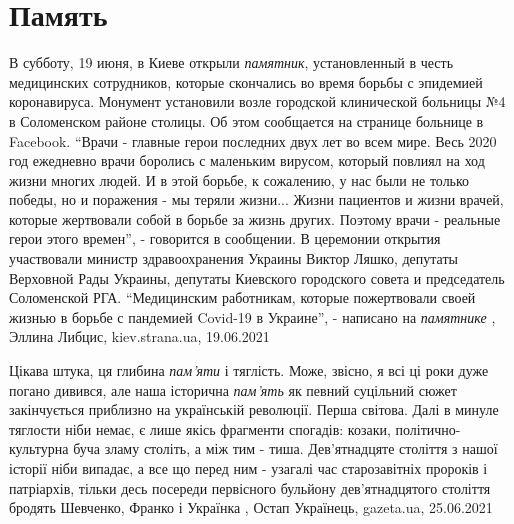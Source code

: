  
 
 
 
 
\chapter{Память}
\label{sec:slova.pamjat}

В субботу, 19 июня, в Киеве открыли \emph{памятник}, установленный в честь
медицинских сотрудников, которые скончались во время борьбы с эпидемией
коронавируса.  Монумент установили возле городской клинической больницы №4 в
Соломенском районе столицы.  Об этом сообщается на странице больнице в
Facebook.  \enquote{Врачи - главные герои последних двух лет во всем мире. Весь
2020 год ежедневно врачи боролись с маленьким вирусом, который повлиял на ход
жизни многих людей. И в этой борьбе, к сожалению, у нас были не только победы,
но и поражения - мы теряли жизни... Жизни пациентов и жизни врачей, которые
жертвовали собой в борьбе за жизнь других. Поэтому врачи - реальные герои этого
времен}, - говорится в сообщении.  В церемонии открытия участвовали министр
здравоохранения Украины Виктор Ляшко, депутаты Верховной Рады Украины, депутаты
Киевского городского совета и председатель Соломенской РГА.
\enquote{Медицинским работникам, которые пожертвовали своей жизнью в борьбе с
пандемией Covid-19 в Украине}, - написано на \emph{памятнике}
, 
Эллина Либцис, kiev.strana.ua, 19.06.2021


Цікава штука, ця глибина \emph{пам'яти} і тяглість. Може, звісно, я всі ці роки дуже
погано дивився, але наша історична \emph{пам'ять} як певний суцільний сюжет
закінчується приблизно на українській революції. Перша світова. Далі в минуле
тяглости ніби немає, є лише якісь фрагменти спогадів: козаки,
політично-культурна буча зламу століть, а між тим - тиша. Дев'ятнадцяте
століття з нашої історії ніби випадає, а все що перед ним - узагалі час
старозавітніх пророків і патріархів, тільки десь посереди первісного бульйону
дев'ятнадцятого століття бродять Шевченко, Франко і Українка
, 
Остап Українець, gazeta.ua, 25.06.2021

